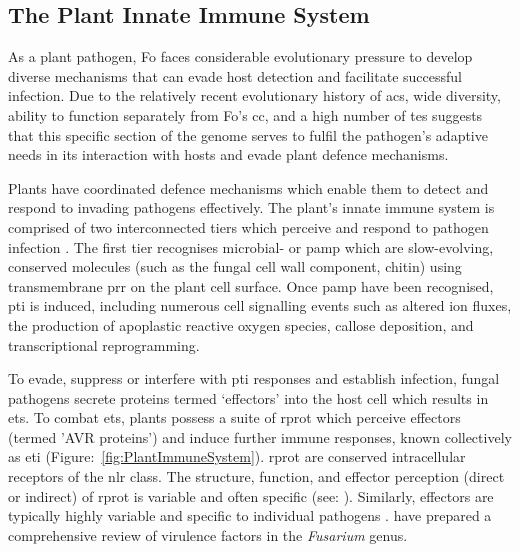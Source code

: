 \subsection{The Plant Innate Immune System}

As a plant pathogen, \ac{Fo} faces considerable evolutionary pressure to develop diverse mechanisms that can evade host detection and facilitate successful infection. Due to the relatively recent evolutionary history of \acp{ac}, wide diversity, ability to function separately from \ac{Fo}'s \ac{cc}, and a high number of \acp{te} suggests that this specific section of the genome serves to fulfil the pathogen's adaptive needs in its interaction with hosts and evade plant defence mechanisms.

Plants have coordinated defence mechanisms which enable them to detect and respond to invading pathogens effectively. The plant’s innate immune system is comprised of two interconnected tiers which perceive and respond to pathogen infection \parencite{Jones2006, Han2019, DeFalco2021}. The first tier recognises microbial- or \ac{pamp} which are slow-evolving, conserved molecules (such as the fungal cell wall component, chitin) using transmembrane \ac{prr} on the plant cell surface. Once \ac{pamp} have been recognised, \ac{pti} is induced, including numerous cell signalling events such as altered ion fluxes, the production of apoplastic reactive oxygen species, callose deposition, and transcriptional reprogramming. 

To evade, suppress or interfere with \ac{pti} responses and establish infection, fungal pathogens secrete proteins termed ‘effectors’ into the host cell which results in \ac{ets}. To combat \ac{ets}, plants possess a suite of \ac{rprot} which perceive effectors (termed '\ac{AVR} proteins') and induce further immune responses, known collectively as \ac{eti} \parencite{Jones2006} (Figure:~\ref{fig:PlantImmuneSystem}). \Ac{rprot} are conserved intracellular receptors of the \ac{nlr} class. The structure, function, and effector perception (direct or indirect) of \ac{rprot} is variable and often specific (see: \textcite{Chen2022, Wang2022}). Similarly, effectors are typically highly variable and specific to individual pathogens \parencite{LoPresti2015}. \textcite{Gutierrez2023} have prepared a comprehensive review of virulence factors in the \textit{Fusarium} genus. 

